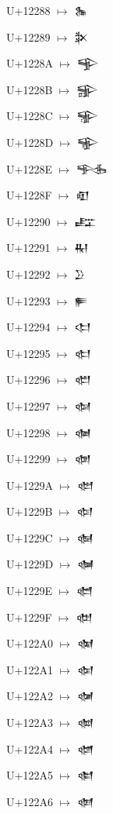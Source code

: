 {\noindent U+12288  $\mapsto$ {\cufont 𒊈}\par
\noindent U+12289  $\mapsto$ {\cufont 𒊉}\par
\noindent U+1228A  $\mapsto$ {\cufont 𒊊}\par
\noindent U+1228B  $\mapsto$ {\cufont 𒊋}\par
\noindent U+1228C  $\mapsto$ {\cufont 𒊌}\par
\noindent U+1228D  $\mapsto$ {\cufont 𒊍}\par
\noindent U+1228E  $\mapsto$ {\cufont 𒊎}\par
\noindent U+1228F  $\mapsto$ {\cufont 𒊏}\par
\noindent U+12290  $\mapsto$ {\cufont 𒊐}\par
\noindent U+12291  $\mapsto$ {\cufont 𒊑}\par
\noindent U+12292  $\mapsto$ {\cufont 𒊒}\par
\noindent U+12293  $\mapsto$ {\cufont 𒊓}\par
\noindent U+12294  $\mapsto$ {\cufont 𒊔}\par
\noindent U+12295  $\mapsto$ {\cufont 𒊕}\par
\noindent U+12296  $\mapsto$ {\cufont 𒊖}\par
\noindent U+12297  $\mapsto$ {\cufont 𒊗}\par
\noindent U+12298  $\mapsto$ {\cufont 𒊘}\par
\noindent U+12299  $\mapsto$ {\cufont 𒊙}\par
\noindent U+1229A  $\mapsto$ {\cufont 𒊚}\par
\noindent U+1229B  $\mapsto$ {\cufont 𒊛}\par
\noindent U+1229C  $\mapsto$ {\cufont 𒊜}\par
\noindent U+1229D  $\mapsto$ {\cufont 𒊝}\par
\noindent U+1229E  $\mapsto$ {\cufont 𒊞}\par
\noindent U+1229F  $\mapsto$ {\cufont 𒊟}\par
\noindent U+122A0  $\mapsto$ {\cufont 𒊠}\par
\noindent U+122A1  $\mapsto$ {\cufont 𒊡}\par
\noindent U+122A2  $\mapsto$ {\cufont 𒊢}\par
\noindent U+122A3  $\mapsto$ {\cufont 𒊣}\par
\noindent U+122A4  $\mapsto$ {\cufont 𒊤}\par
\noindent U+122A5  $\mapsto$ {\cufont 𒊥}\par
\noindent U+122A6  $\mapsto$ {\cufont 𒊦}\par
}
